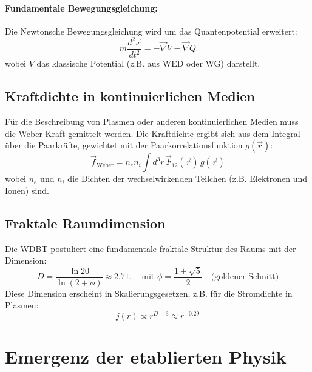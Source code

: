 \documentclass[11pt, a4paper]{article}
\begin{document}
\paragraph{Fundamentale Bewegungsgleichung:}
Die Newtonsche Bewegungsgleichung wird um das Quantenpotential erweitert:
\begin{equation}
\label{eq:bewegung_q}
m \frac{d^2 \vec{x}}{dt^2} = -\vec{\nabla} V - \vec{\nabla} Q
\end{equation}
wobei $V$ das klassische Potential (z.B. aus WED oder WG) darstellt.

\subsection{Kraftdichte in kontinuierlichen Medien}
\label{subsec:kraftdichte}

Für die Beschreibung von Plasmen oder anderen kontinuierlichen Medien muss die Weber-Kraft gemittelt werden. Die Kraftdichte ergibt sich aus dem Integral über die Paarkräfte, gewichtet mit der Paarkorrelationsfunktion $g(\vec{r})$:
\begin{equation}
\label{eq:kraftdichte}
\vec{f}_{\text{Weber}} = n_e n_i \int d^3r \, \vec{F}_{12}(\vec{r}) \, g(\vec{r})
\end{equation}
wobei $n_e$ und $n_i$ die Dichten der wechselwirkenden Teilchen (z.B. Elektronen und Ionen) sind.

\subsection{Fraktale Raumdimension}
\label{subsec:fraktal}

Die WDBT postuliert eine fundamentale fraktale Struktur des Raums mit der Dimension:
\begin{equation}
\label{eq:fraktal_dim}
D = \frac{\ln 20}{\ln(2 + \phi)} \approx 2.71, \quad \text{mit } \phi = \frac{1 + \sqrt{5}}{2} \quad \text{(goldener Schnitt)}
\end{equation}
Diese Dimension erscheint in Skalierungsgesetzen, z.B. für die Stromdichte in Plasmen:
\begin{equation}
\label{eq:fraktal_strom}
j(r) \propto r^{D-3} \approx r^{-0.29}
\end{equation}

\section{Emergenz der etablierten Physik}
\label{sec:emergenz}
\end{document}

